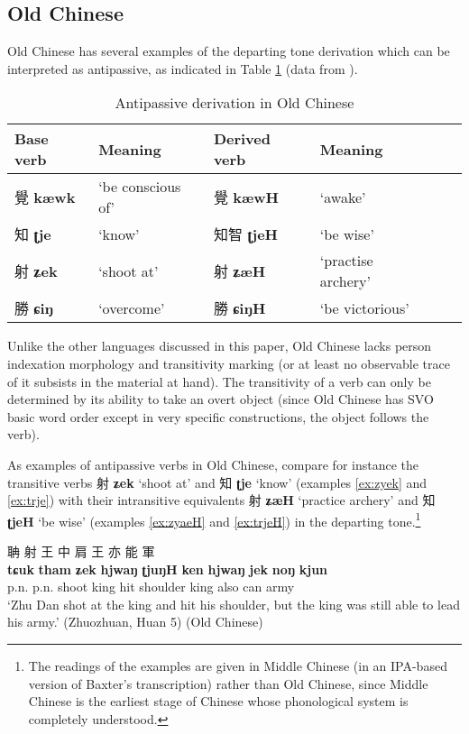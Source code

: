 \documentclass[oneside,a4paper,11pt]{article}
\newcommand{\ipa}[1]{{\phon\textbf{#1}}}
\newcommand{\zh}[1]{{\cn #1}}
\newcommand{\zhc}[2]{\zh{#1} \ipa{#2}}
\begin{document}
\subsection{Old Chinese} \label{sec:oc}
Old Chinese has several examples of the departing tone derivation which can be interpreted as antipassive, as indicated in Table \ref{tab:oc} (data from \citealt[287-288]{downer59}).

\begin{table}[H]
\caption{Antipassive derivation in Old Chinese} \label{tab:oc} \centering
\begin{tabular}{llllll}
\toprule
Base verb & Meaning & Derived verb & Meaning \\
\midrule
\zhc{覺}{kæwk} & `be conscious of' &  \zhc{覺}{kæwH}& `awake' \\
\zhc{知}{ʈje} & `know' &  \zhc{知智}{ʈjeH}& `be wise' \\
\zhc{射}{ʑek} & `shoot at' &  \zhc{射}{ʑæH}& `practise archery' \\
\zhc{勝}{ɕiŋ} & `overcome' &  \zhc{勝}{ɕiŋH}& `be victorious' \\
\bottomrule
\end{tabular}
\end{table}

Unlike the other languages discussed in this paper, Old Chinese lacks person indexation morphology and transitivity marking (or at least no observable trace of it subsists in the material at hand). The transitivity of a verb can only be determined by its ability to take an overt object (since Old Chinese has SVO basic word order except in very specific constructions, the object follows the verb).

As examples of antipassive verbs in Old Chinese, compare for instance the transitive verbs \zhc{射}{ʑek} `shoot at'  and \zhc{知}{ʈje}  `know'  (examples \ref{ex:zyek} and \ref{ex:trje}) with their intransitive equivalents \zhc{射}{ʑæH}  `practice archery' and  \zhc{知}{ʈjeH} `be wise' (examples \ref{ex:zyaeH} and \ref{ex:trjeH}) in the departing tone.\footnote{The readings of the examples are given in Middle Chinese (in an IPA-based version of Baxter's \citeyear{baxter92} transcription) rather than Old Chinese, since Middle Chinese is the earliest stage of Chinese whose phonological system is completely understood. }

\begin{exe}
\ex \label{ex:zyek}
\glt
\glt \zh{祝聃射王中肩，王亦能軍}  %
\glll \zh{祝} \zh{聃} \zh{射} \zh{王} \zh{中} \zh{肩} \zh{王} \zh{亦} \zh{能} \zh{軍} \\
\ipa{tɕuk} \ipa{tham} \ipa{ʑek} \ipa{hjwaŋ} \ipa{ʈjuŋH} \ipa{ken} \ipa{hjwaŋ}  \ipa{jek}   \ipa{noŋ} \ipa{kjun}     \\
p.n. p.n. shoot king hit shoulder king also can army \\
\glt `Zhu Dan shot at the king and hit his shoulder, but the king was still able to lead his army.'  (Zhuozhuan, Huan 5) (Old Chinese)
\end{exe}
\end{document}

